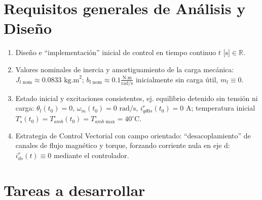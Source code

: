 \documentclass[11pt,a4paper]{article}
\begin{document}
\section{Requisitos generales de Análisis y Diseño}
\begin{enumerate}[label=\alph*)]
    \item Diseño e ``implementación'' inicial de control en tiempo continuo $t \text{ [s]} \in \mathbb{R}$.
    \item Valores nominales de inercia y amortiguamiento de la carga mecánica: $J_{l \text{ nom}} \approx 0.0833 \text{ kg.m}^2$; $b_{l \text{ nom}} \approx 0.1 \frac{\text{N.m}}{\text{rad/s}}$ inicialmente sin carga útil, $m_l \equiv 0$.
    \item Estado inicial y excitaciones consistentes, ej. equilibrio detenido sin tensión ni carga: $\theta_l(t_0) = 0$, $\omega_m(t_0) = 0 \text{ rad/s}$, $i_{qd0s}^r(t_0) = 0 \text{ A}$; temperatura inicial $T_s^\circ(t_0) = T_{amb}^\circ(t_0) = T_{amb \text{ max}}^\circ = 40^\circ\text{C}$.
    \item Estrategia de Control Vectorial con campo orientado: ``desacoplamiento'' de canales de flujo magnético y torque, forzando corriente nula en eje d: $i_{ds}^r(t) \equiv 0$ mediante el controlador.
\end{enumerate}

\section{Tareas a desarrollar}
\end{document}
